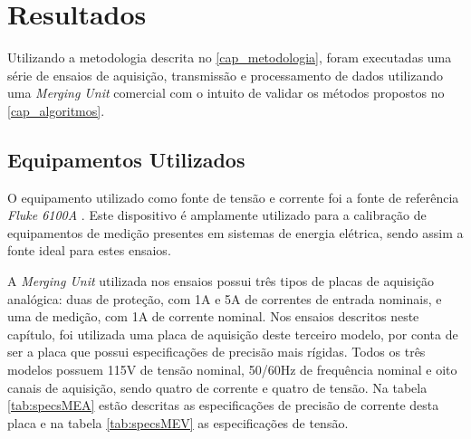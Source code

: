 



\chapter{Resultados}
\label{cap_resultados}

Utilizando a metodologia descrita no \autoref{cap_metodologia}, foram executadas uma série de ensaios de aquisição, transmissão e processamento de dados utilizando uma \textit{Merging Unit} comercial com o intuito de validar os métodos propostos no \autoref{cap_algoritmos}. 

\section{Equipamentos Utilizados}

O equipamento utilizado como fonte de tensão e corrente foi a fonte de referência \textit{Fluke 6100A} \cite{fluke6100a}. Este dispositivo é amplamente utilizado para a calibração de equipamentos de medição presentes em sistemas de energia elétrica, sendo assim a fonte ideal para estes ensaios.

A \textit{Merging Unit} utilizada nos ensaios possui três tipos de placas de aquisição analógica: duas de proteção, com 1A e 5A de correntes de entrada nominais, e uma de medição, com 1A de corrente nominal. Nos ensaios descritos neste capítulo, foi utilizada uma placa de aquisição deste terceiro modelo, por conta de ser a placa que possui especificações de precisão mais rígidas. Todos os três modelos possuem 115V de tensão nominal, 50/60Hz de frequência nominal e oito canais de aquisição, sendo quatro de corrente e quatro de tensão. Na tabela \ref{tab:specsMEA} estão descritas as especificações de precisão de corrente desta placa e na tabela \ref{tab:specsMEV} as especificações de tensão.

